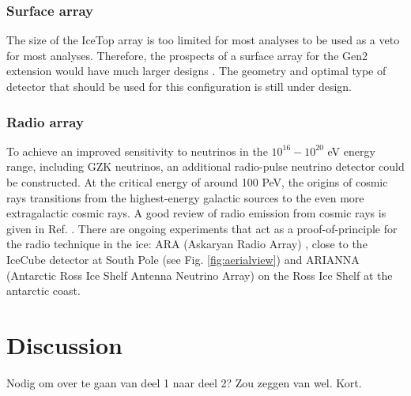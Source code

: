 \subsubsection{Surface array}
The size of the IceTop array is too limited for most analyses to be used as a veto for most analyses. Therefore, the prospects of a surface array for the Gen2 extension would have much larger designs \cite{Euler:2015oen}. The geometry and optimal type of detector that should be used for this configuration is still under design.
\subsubsection{Radio array}
To achieve an improved sensitivity to neutrinos in the $10^{16} - 10^{20}$ eV energy range, including GZK neutrinos, an additional radio-pulse neutrino detector could be constructed. At the critical energy of around 100 PeV, the origins of cosmic rays transitions from the highest-energy galactic sources to the even more extragalactic cosmic rays. A good review of radio emission from cosmic rays is given in Ref. \cite{Schroder:2016hrv}. There are ongoing experiments that act as a proof-of-principle for the radio technique in the ice: ARA (Askaryan Radio Array) \cite{Allison:2015eky}, close to the IceCube detector at South Pole (see Fig. \ref{fig:aerialview}) and ARIANNA (Antarctic Ross Ice Shelf Antenna Neutrino Array) \cite{Glaser:2018ifj} on the Ross Ice Shelf at the antarctic coast.






\section{Discussion}
Nodig om over te gaan van deel 1 naar deel 2? Zou zeggen van wel. Kort.


 

